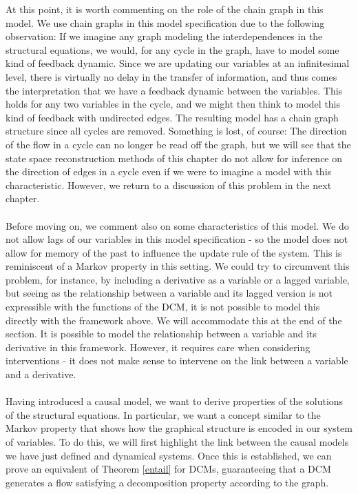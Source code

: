 \documentclass[11pt, a4paper]{memoir}
\theoremstyle{break}
\theoremstyle{break}
\theoremstyle{nonumberplain}
\begin{document}
At this point, it is worth commenting on the role of the chain graph in this model. We use chain graphs in this model specification due to the following observation: If we imagine any graph modeling the interdependences in the structural equations, we would, for any cycle in the graph, have to model some kind of feedback dynamic. Since we are updating our variables at an infinitesimal level, there is virtually no delay in the transfer of information, and thus comes the interpretation that we have a feedback dynamic between the variables. This holds for any two variables in the cycle, and we might then think to model this kind of feedback with undirected edges. The resulting model has a chain graph structure since all cycles are removed. Something is lost, of course: The direction of the flow in a cycle can no longer be read off the graph, but we will see that the state space reconstruction methods of this chapter do not allow for inference on the direction of edges in a cycle even if we were to imagine a model with this characteristic. However, we return to a discussion of this problem in the next chapter.\\\\
Before moving on, we comment also on some characteristics of this model. We do not allow lags of our variables in this model specification - so the model does not allow for memory of the past to influence the update rule of the system. This is reminiscent of a Markov property in this setting. We could try to circumvent this problem, for instance, by including a derivative as a variable or a lagged variable, but seeing as the relationship between a variable and its lagged version is not expressible with the functions of the DCM, it is not possible to model this directly with the framework above. We will accommodate this at the end of the section. It is possible to model the relationship between a variable and its derivative in this framework. However, it requires care when considering interventions - it does not make sense to intervene on the link between a variable and a derivative.\\\\
Having introduced a causal model, we want to derive properties of the solutions of the structural equations. In particular, we want a concept similar to the Markov property that shows how the graphical structure is encoded in our system of variables. To do this, we will first highlight the link between the causal models we have just defined and dynamical systems. Once this is established, we can prove an equivalent of Theorem \ref{entail} for DCMs, guaranteeing that a DCM generates a flow satisfying a decomposition property according to the graph.
\end{document}

